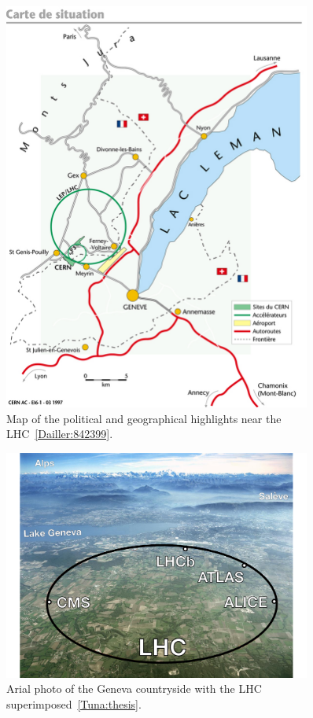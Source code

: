 \begin{figure}[h]
 \begin{center}
    \includegraphics[width=0.90\textwidth]{figures/experiment/lhc-pho-1997-169.jpg}
      \end{center}
\caption{Map of the political and geographical highlights near the LHC~\ref{Dailler:842399}.}
\label{fig:lhc_mapwithcities}
\end{figure}

\begin{figure}[h]
 \begin{center}
    \includegraphics[width=0.90\textwidth]{figures/experiment/lhc-switzerland.pdf}
      \end{center}
\caption{Arial photo of the Geneva countryside with the LHC superimposed~\ref{Tuna:thesis}.}
\label{fig:lhc_map_tuna}
\end{figure}


